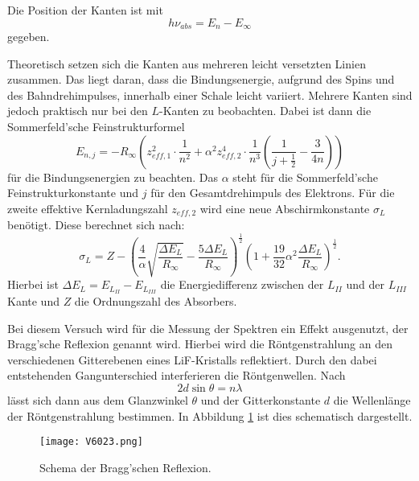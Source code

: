 \documentclass[
  bibliography=totoc,     %
  captions=tableheading,  %
  titlepage=firstiscover, %
]{scrartcl}
\begin{document}
\noindent
Die Position der Kanten ist mit
\begin{equation}
  h \nu_{abs} = E_n - E_\infty
  \label{eqn:abskante}
\end{equation}
gegeben.

\noindent
Theoretisch setzen sich die Kanten aus mehreren leicht versetzten Linien
zusammen. Das liegt daran, dass die Bindungsenergie, aufgrund des Spins und
des Bahndrehimpulses, innerhalb einer Schale leicht variiert. Mehrere Kanten
sind jedoch praktisch nur bei den $L$-Kanten zu beobachten. Dabei ist dann die
Sommerfeld'sche Feinstrukturformel
\begin{equation}
  E_{n,j} = - R_\infty \left( z_{eff,1}^2 \cdot \frac{1}{n^2} + \alpha^2 z_{eff,2}^4 \cdot \frac{1}{n^3} \left( \frac{1}{j+\frac{1}{2}} - \frac{3}{4n} \right) \right)
  \label{eqn:sommerfeld}
\end{equation}
für die Bindungsenergien zu beachten.
Das $\alpha$ steht für die Sommerfeld'sche Feinstrukturkonstante und $j$ für
den Gesamtdrehimpuls des Elektrons.
Für die zweite effektive Kernladungszahl $z_{eff,2}$ wird eine neue
Abschirmkonstante $\sigma_L$ benötigt.
Diese berechnet sich nach:
\begin{equation}
  \sigma_L = Z - \left( \frac{4}{\alpha} \sqrt{\frac{\Delta E_L}{R_\infty}} - \frac{5 \Delta E_L}{R_\infty} \right)^\frac{1}{2} \left( 1+ \frac{19}{32} \alpha^2 \frac{\Delta E_L}{R_\infty} \right)^\frac{1}{2}.
  \label{eqn:sigl}
\end{equation}
Hierbei ist $\Delta E_L = E_{L_{II}} - E_{L_{III}}$ die Energiedifferenz zwischen
der $L_{II}$ und der $L_{III}$ Kante und $Z$ die Ordnungszahl des Absorbers.

\noindent
Bei diesem Versuch wird für die Messung der Spektren ein Effekt ausgenutzt, der
Bragg'sche Reflexion genannt wird. Hierbei wird die Röntgenstrahlung an den
verschiedenen Gitterebenen eines LiF-Kristalls reflektiert. Durch den dabei
entstehenden Gangunterschied interferieren die Röntgenwellen. Nach
\begin{equation}
  2 d \sin \theta = n \lambda
  \label{eqn:bragg}
\end{equation}
lässt sich dann aus dem Glanzwinkel $\theta$ und der Gitterkonstante $d$ die
Wellenlänge der Röntgenstrahlung bestimmen. In Abbildung \ref{fig:V6023} ist
dies schematisch dargestellt.
\begin{figure}[htb]
  \centering
  \texttt{[image: V6023.png]}
  \caption{Schema der Bragg'schen Reflexion. \cite{anleitung}}
  \label{fig:V6023}
\end{figure}
\clearpage
\end{document}
